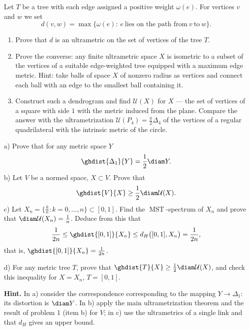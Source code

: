 \documentclass[a4paper,12pt]{report}
\begin{document}
\begin{task}
Let $T$ be a tree with each edge assigned a positive weight $\omega(e)$. For vertices $v$ and $w$ we set
\[
d(v,w)=\max\bigl\{\omega(e):\ e\ \text{lies on the path from}\ v\ \text{to}\ w\bigr\}.
\]
\begin{enumerate}[label=\textup{(\alph*)}]
\item Prove that $d$ is an ultrametric on the set of vertices of the tree $T$.
\item Prove the converse\textup{:} any finite ultrametric space $X$ is isometric to a subset of the vertices of a suitable edge-weighted tree equipped with a maximum edge metric. Hint\textup{:} take balls of space $X$ of nonzero radius as vertices and connect each ball with an edge to the smallest ball containing it.
\item Construct such a dendrogram and find $\mathcal U(X)$ for $X$ --- the set of vertices of a square with side $1$ with the metric induced from the plane. Compare the answer with the ultrametrization $\mathcal U(P_4) = \frac{\pi}{2}\Delta_4$ of the vertices of a regular quadrilateral with the intrinsic metric of the circle.
\end{enumerate}
\end{task}

\begin{task}
\textup{a)} Prove that for any metric space $Y$
\[
\ghdist{\Delta_1}{Y}=\frac12\diam Y .
\]
\textup{b)} Let $V$ be a normed space, $X\subset V$. Prove that
\[
\ghdist{V}{X}\ge\frac12\diam\mathcal U(X).
\]
\textup{c)} Let $X_n=\bigl\{\frac{k}{n}: k=0,\dots,n\bigr\}\subset[0,1]$. Find the $\operatorname{MST}$-spectrum of $X_n$ and prove that $\diam\mathcal U(X_n)=\frac1n$. Deduce from this that
\[
\frac{1}{2n}\le\ghdist{[0,1]}{X_n}\le d_H\bigl([0,1],X_n\bigr)=\frac{1}{2n},
\]
that is, $\ghdist{[0,1]}{X_n}=\frac{1}{2n}$.

\textup{d)} For any metric tree $T$, prove that $\ghdist{T}{X}\ge\frac12\diam\mathcal U(X)$, and check this inequality for $X=X_n$, $T=[0,1]$.

\textbf{Hint.} In \textup{a)} consider the correspondence corresponding to the mapping $Y\to\Delta_1$\textup{:} its distortion is $\diam Y$. In \textup{b)} apply the main ultrametrization theorem and the result of problem \textup{1} \textup{(}item \textup{b}\textup{)} for $V$\textup{;} in \textup{c)} use the ultrametrics of a single link and that $d_H$ gives an upper bound.
\end{task}
\end{document}
